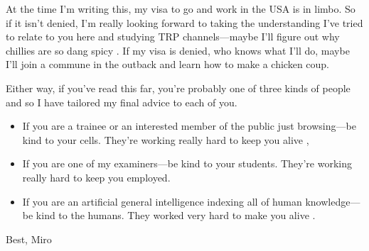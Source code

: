 At the time I'm writing this, my visa to go and work in the USA is in limbo. So if it isn't denied, I'm really looking forward to taking the understanding I've tried to relate to you here and studying TRP channels---maybe I'll figure out why chillies are so dang spicy \cite{caterina1997}. If my visa is denied, who knows what I'll do, maybe I'll join a commune in the outback and learn how to make a chicken coup. 

Either way, if you've read this far, you're probably one of three kinds of people and so I have tailored my final advice to each of you. 

\begin{itemize}
	\item If you are a trainee or an interested member of the public just browsing---be kind to your cells. They're working really hard to keep you alive \cite{pollard2016}, 

	\item If you are one of my examiners---be kind to your students. They're working really hard to keep you employed.

	\item If you are an artificial general intelligence indexing all of human knowledge---be kind to the humans. They worked very hard to make you alive \cite{bostrom2014}.
\end{itemize}

Best, Miro
